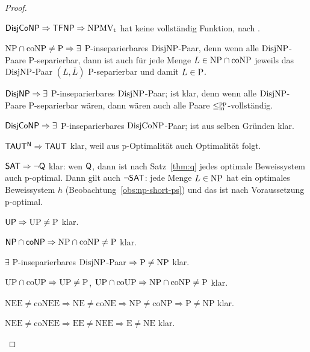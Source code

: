 \begin{proof}
\begin{Prooflist}[nosep]
\item $\hDisjCoNP \Rightarrow \hTFNP \Rightarrow \NPMVt$ hat keine vollständig Funktion, nach \textcite{pudlak_incompleteness_2017}.
\item $\NP\cap\coNP\neq \P \Rightarrow\exists$ P-inseparierbares $\DisjNP$-Paar, denn wenn alle $\DisjNP$-Paare P-separierbar, dann ist auch für jede Menge $L\in\NP\cap\coNP$ jeweils das $\DisjNP$-Paar $(L,\overline{L})$ P-separierbar und damit $L\in\P$.
\item $\hDisjNP \Rightarrow \exists$ P-inseparierbares $\DisjNP$-Paar; ist klar, denn wenn alle $\DisjNP$-Paare P-separierbar wären, dann wären auch alle Paare $\leqmpp$-vollständig.
\item $\hDisjCoNP \Rightarrow \exists$ P-inseparierbares $\DisjCoNP$-Paar; ist aus selben Gründen klar.
\item $\mathsf{TAUT^N} \Rightarrow \hTAUT$ klar, weil aus p-Optimalität auch Optimalität folgt.
\item $\mathsf \hSAT \Rightarrow \neg\hQ $ klar: wen $\hQ$, dann ist nach Satz~\ref{thm:q} jedes optimale Beweissystem auch p-optimal. Dann gilt auch $\neg\hSAT$: jede Menge $L\in\NP$ hat ein optimales Beweissystem $h$ (Beobachtung~\ref{obs:np-short-ps}) und das ist nach Voraussetzung p-optimal.
\item $\hUP \Rightarrow \UP\neq\P$ klar.
\item $\hNPcoNP \Rightarrow \NP\cap\coNP\neq \P$ klar.
\item $\exists$ P-inseparierbares $\DisjNP$-Paar $\Rightarrow \P\neq \NP$ klar.
\item $\UP\cap\coUP\Rightarrow \UP\neq \P$, $\UP\cap\coUP\Rightarrow \NP\cap\coNP\neq\P$ klar.
\item $\mathrm{NEE\neq coNEE \Rightarrow NE \neq coNE \Rightarrow NP \neq coNP \Rightarrow P\neq NP}$ klar.
\item $\mathrm{NEE\neq coNEE \Rightarrow EE \neq NEE \Rightarrow E\neq NE}$ klar.\qedhere
\end{Prooflist}
\end{proof}

